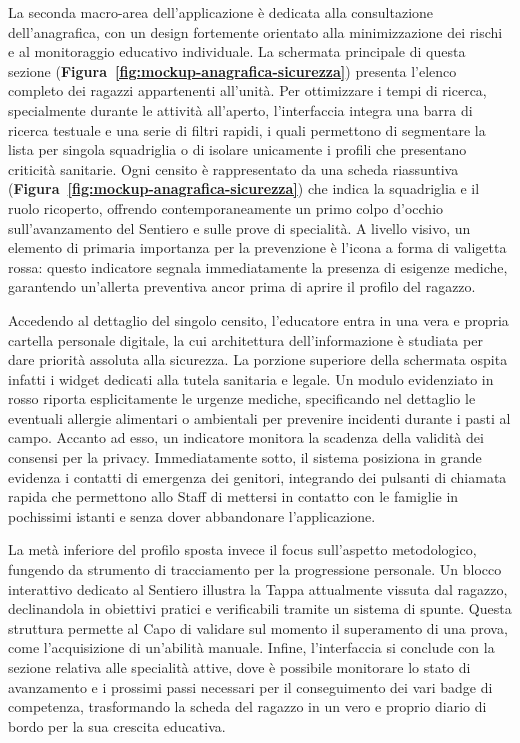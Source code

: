 \documentclass[11pt]{article}
\numberwithin{figure}{section}
\begin{document}
La seconda macro-area dell'applicazione è dedicata alla consultazione dell'anagrafica, con un design fortemente orientato alla minimizzazione dei rischi e al monitoraggio educativo individuale. La schermata principale di questa sezione (\textbf{Figura~\ref{fig:mockup-anagrafica-sicurezza}}) presenta l'elenco completo dei ragazzi appartenenti all'unità. Per ottimizzare i tempi di ricerca, specialmente durante le attività all'aperto, l'interfaccia integra una barra di ricerca testuale e una serie di filtri rapidi, i quali permettono di segmentare la lista per singola squadriglia o di isolare unicamente i profili che presentano criticità sanitarie. Ogni censito è rappresentato da una scheda riassuntiva (\textbf{Figura~\ref{fig:mockup-anagrafica-sicurezza}}) che indica la squadriglia e il ruolo ricoperto, offrendo contemporaneamente un primo colpo d'occhio sull'avanzamento del Sentiero e sulle prove di specialità. A livello visivo, un elemento di primaria importanza per la prevenzione è l'icona a forma di valigetta rossa: questo indicatore segnala immediatamente la presenza di esigenze mediche, garantendo un'allerta preventiva ancor prima di aprire il profilo del ragazzo.

Accedendo al dettaglio del singolo censito, l'educatore entra in una vera e propria cartella personale digitale, la cui architettura dell'informazione è studiata per dare priorità assoluta alla sicurezza. La porzione superiore della schermata ospita infatti i widget dedicati alla tutela sanitaria e legale. Un modulo evidenziato in rosso riporta esplicitamente le urgenze mediche, specificando nel dettaglio le eventuali allergie alimentari o ambientali per prevenire incidenti durante i pasti al campo. Accanto ad esso, un indicatore monitora la scadenza della validità dei consensi per la privacy. Immediatamente sotto, il sistema posiziona in grande evidenza i contatti di emergenza dei genitori, integrando dei pulsanti di chiamata rapida che permettono allo Staff di mettersi in contatto con le famiglie in pochissimi istanti e senza dover abbandonare l'applicazione.

La metà inferiore del profilo sposta invece il focus sull'aspetto metodologico, fungendo da strumento di tracciamento per la progressione personale. Un blocco interattivo dedicato al Sentiero illustra la Tappa attualmente vissuta dal ragazzo, declinandola in obiettivi pratici e verificabili tramite un sistema di spunte. Questa struttura permette al Capo di validare sul momento il superamento di una prova, come l'acquisizione di un'abilità manuale. Infine, l'interfaccia si conclude con la sezione relativa alle specialità attive, dove è possibile monitorare lo stato di avanzamento e i prossimi passi necessari per il conseguimento dei vari badge di competenza, trasformando la scheda del ragazzo in un vero e proprio diario di bordo per la sua crescita educativa.
\end{document}

